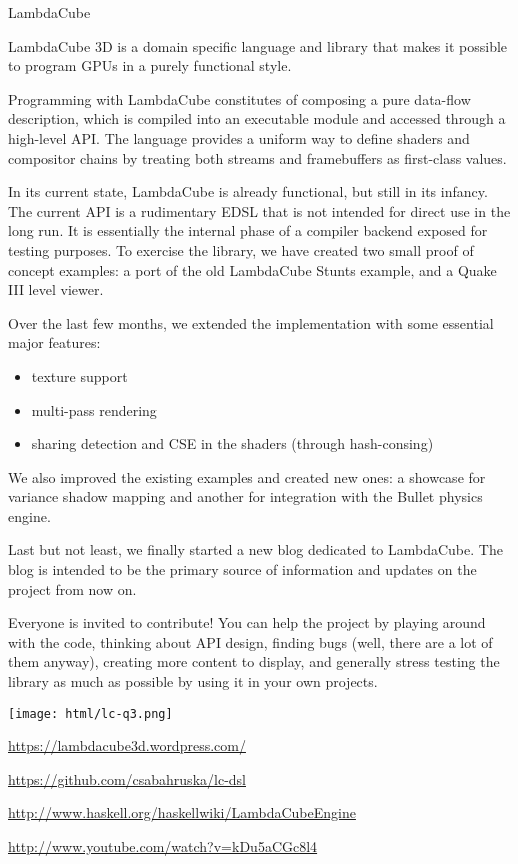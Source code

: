 \begin{hcarentry}[updated]{LambdaCube}
\makeheader

LambdaCube 3D is a domain specific language and library that makes it
possible to program GPUs in a purely functional style.

Programming with LambdaCube constitutes of composing a pure data-flow
description, which is compiled into an executable module and accessed
through a high-level API.  The language provides a uniform way to
define shaders and compositor chains by treating both streams and
framebuffers as first-class values.

In its current state, LambdaCube is already functional, but still in
its infancy.  The current API is a rudimentary EDSL that is not
intended for direct use in the long run.  It is essentially the
internal phase of a compiler backend exposed for testing purposes.  To
exercise the library, we have created two small proof of concept
examples: a port of the old LambdaCube Stunts example, and a Quake III
level viewer.

Over the last few months, we extended the implementation with some
essential major features:

\begin{itemize}
\item texture support
\item multi-pass rendering
\item sharing detection and CSE in the shaders (through hash-consing)
\end{itemize}

We also improved the existing examples and created new ones: a
showcase for variance shadow mapping and another for integration with
the Bullet physics engine.

Last but not least, we finally started a new blog dedicated to
LambdaCube.  The blog is intended to be the primary source of
information and updates on the project from now on.

Everyone is invited to contribute! You can help the project by playing
around with the code, thinking about API design, finding bugs (well,
there are a lot of them anyway), creating more content to display, and
generally stress testing the library as much as possible by using it
in your own projects.

\begin{center}
\texttt{[image: html/lc-q3.png]}
\end{center}

\FurtherReading
\begin{compactitem}
\item \url{https://lambdacube3d.wordpress.com/}
\item \url{https://github.com/csabahruska/lc-dsl}
\item \url{http://www.haskell.org/haskellwiki/LambdaCubeEngine}
\item \url{http://www.youtube.com/watch?v=kDu5aCGc8l4}
\end{compactitem}
\end{hcarentry}
